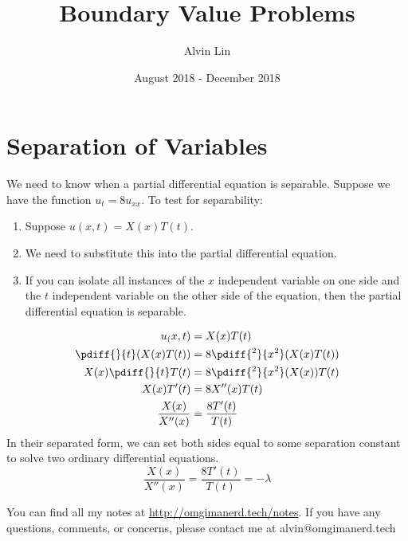 \documentclass{math}
\title{Boundary Value Problems}
\author{Alvin Lin}
\date{August 2018 - December 2018}
\begin{document}
\maketitle

\section*{Separation of Variables}
We need to know when a partial differential equation is separable. Suppose we
have the function \( u_t = 8u_{xx} \). To test for separability:
\begin{enumerate}
  \item Suppose \( u(x,t) = X(x)T(t) \).
  \item We need to substitute this into the partial differential equation.
  \item If you can isolate all instances of the \( x \) independent variable
    on one side and the \( t \) independent variable on the other side of the
    equation, then the partial differential equation is separable.
\end{enumerate}
\begin{align*}
  u_(x,t) &= X(x)T(t) \\
  \pdiff{}{t}(X(x)T(t)) &= 8\pdiff{^2}{x^2}(X(x)T(t)) \\
  X(x)\pdiff{}{t}T(t) &= 8\pdiff{^2}{x^2}(X(x))T(t) \\
  X(x)T'(t) &= 8X''(x)T(t) \\
  \frac{X(x)}{X''(x)} &= \frac{8T'(t)}{T(t)}
\end{align*}
In their separated form, we can set both sides equal to some separation constant
to solve two ordinary differential equations.
\[ \frac{X(x)}{X''(x)} = \frac{8T'(t)}{T(t)} = -\lambda \]

\begin{center}
  You can find all my notes at \url{http://omgimanerd.tech/notes}. If you have
  any questions, comments, or concerns, please contact me at
  alvin@omgimanerd.tech
\end{center}
\end{document}

